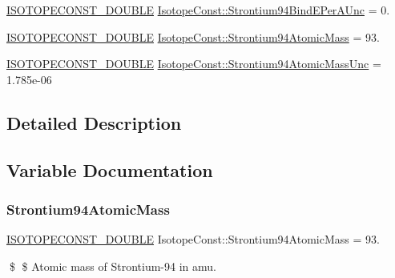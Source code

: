 \begin{DoxyCompactItemize}
\mbox{\hyperlink{group___isotope_const-_macros_ga8f45a7272ce02c0b4c65c44636ed719a}{I\+S\+O\+T\+O\+P\+E\+C\+O\+N\+S\+T\+\_\+\+D\+O\+U\+B\+LE}} \mbox{\hyperlink{group___isotope_const-_strontium-_sr94_ga9e607c4299760cc7d42f832b21b875cf}{Isotope\+Const\+::\+Strontium94\+Bind\+E\+Per\+A\+Unc}} = 0.
\item 
\mbox{\hyperlink{group___isotope_const-_macros_ga8f45a7272ce02c0b4c65c44636ed719a}{I\+S\+O\+T\+O\+P\+E\+C\+O\+N\+S\+T\+\_\+\+D\+O\+U\+B\+LE}} \mbox{\hyperlink{group___isotope_const-_strontium-_sr94_ga4a0616c63cb68dd4ea332c61b32aedf6}{Isotope\+Const\+::\+Strontium94\+Atomic\+Mass}} = 93.
\item 
\mbox{\hyperlink{group___isotope_const-_macros_ga8f45a7272ce02c0b4c65c44636ed719a}{I\+S\+O\+T\+O\+P\+E\+C\+O\+N\+S\+T\+\_\+\+D\+O\+U\+B\+LE}} \mbox{\hyperlink{group___isotope_const-_strontium-_sr94_ga7154effa8c8a799276b489568717302b}{Isotope\+Const\+::\+Strontium94\+Atomic\+Mass\+Unc}} = 1.\+785e-\/06
\end{DoxyCompactItemize}


\subsection{Detailed Description}


\subsection{Variable Documentation}
\mbox{\label{group___isotope_const-_strontium-_sr94_ga4a0616c63cb68dd4ea332c61b32aedf6}} 
\subsubsection{\texorpdfstring{Strontium94\+Atomic\+Mass}{Strontium94AtomicMass}}
{\footnotesize\ttfamily \mbox{\hyperlink{group___isotope_const-_macros_ga8f45a7272ce02c0b4c65c44636ed719a}{I\+S\+O\+T\+O\+P\+E\+C\+O\+N\+S\+T\+\_\+\+D\+O\+U\+B\+LE}} Isotope\+Const\+::\+Strontium94\+Atomic\+Mass = 93.}

\$ \$ Atomic mass of Strontium-\/94 in amu. \mbox{\label{group___isotope_const-_strontium-_sr94_ga7154effa8c8a799276b489568717302b}} 
